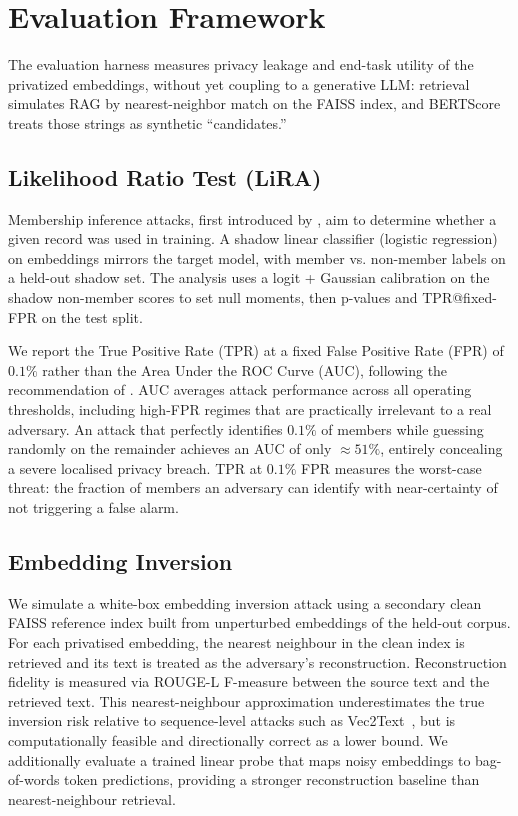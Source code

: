 \documentclass[11pt, a4paper]{article}
\begin{document}
\section{Evaluation Framework}
\label{sec:framework}

The evaluation harness measures privacy leakage and end-task utility of the
privatized embeddings, without yet coupling to a generative LLM: retrieval simulates
RAG by nearest-neighbor match on the FAISS index, and BERTScore treats those strings
as synthetic ``candidates.''

\subsection{Likelihood Ratio Test (LiRA)}
Membership inference attacks, first introduced by \citet{shokri2017membership}, 
aim to determine whether a given record was used in training. A shadow linear 
classifier (logistic regression) on embeddings mirrors the target model, with 
member vs. non-member labels on a held-out shadow set. The analysis uses
a logit + Gaussian calibration on the shadow non-member scores to set null moments,
then p-values and TPR@fixed-FPR on the test split.

We report the True Positive Rate (TPR) at a fixed False Positive Rate (FPR)
of $0.1\%$ rather than the Area Under the ROC Curve (AUC), following the recommendation of \citet{carlini2022membership}. AUC averages
attack performance across all operating thresholds, including high-FPR
regimes that are practically irrelevant to a real adversary. An attack that
perfectly identifies $0.1\%$ of members while guessing randomly on the
remainder achieves an AUC of only $\approx 51\%$, entirely concealing a
severe localised privacy breach. TPR at $0.1\%$ FPR measures the worst-case
threat: the fraction of members an adversary can identify with near-certainty
of not triggering a false alarm.

\subsection{Embedding Inversion}
We simulate a white-box embedding inversion attack using a secondary clean FAISS reference index built from unperturbed embeddings of the held-out corpus. For each privatised embedding, the nearest neighbour in the clean index is retrieved and its text is treated as the adversary's reconstruction. Reconstruction fidelity is measured via ROUGE-L F-measure between the source text and the retrieved text. This nearest-neighbour approximation underestimates the true inversion risk relative to sequence-level attacks such as Vec2Text~\cite{morris2023}, but is computationally feasible and directionally correct as a lower bound. We additionally evaluate a trained linear probe that maps noisy embeddings to bag-of-words token predictions, providing a stronger reconstruction baseline than nearest-neighbour retrieval.
\end{document}
